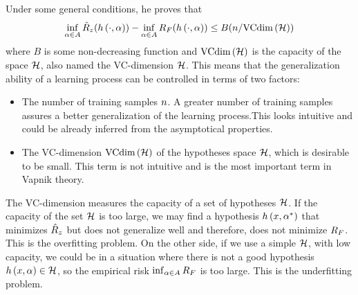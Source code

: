 Under some general conditions, he proves that
\begin{equation}\label{eq:ordinary_generalization_bound}
    \inf_{\param \in \paramspace} \emprisk(\hyp{\cdot}{\param}) - \inf_{\param \in \paramspace} \exprisk(\hyp{\cdot}{\param}) \leq B(\nsamples/\vcdim{\hypspace})
\end{equation}
where $B$ is some non-decreasing function and $\text{VCdim}\left(\mathcal{H}\right)$ is the capacity of the space $\mathcal{H}$, also named the VC-dimension $\mathcal{H}$. This means that the generalization ability of a learning process can be controlled in terms of two factors:
\begin{itemize}
    \item The number of training samples $n$. A greater number of training samples assures a better generalization of the learning process.This looks intuitive and could be already inferred from the asymptotical properties. 
    \item The VC-dimension $\text{VCdim}\left(\mathcal{H}\right)$ of the hypotheses space $\mathcal{H}$, which is desirable to be small. This term is not intuitive and is the most important term in Vapnik theory.
\end{itemize}
The VC-dimension measures the capacity of a set of hypotheses $\mathcal{H}$. 
If the capacity of the set $\mathcal{H}$ is too large, we may find a
hypothesis $h\left(x, {\alpha}^*\right)$ that minimizes $\hat{R}_z$ but does not 
generalize well and therefore, does not minimize $R_F$. This is the 
overfitting problem. 
On the other side, if we use a simple $\mathcal{H}$, 
with low capacity, we could be in a situation where there is not a good hypothesis $h\left(x, \alpha\right) \in \mathcal{H}$, so the empirical risk $\inf_{\alpha \in A} R_F$ is too large. This is the underfitting problem.


